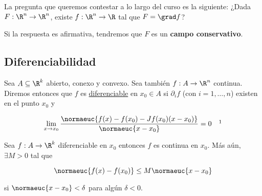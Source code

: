 \begin{pre}
    La pregunta que queremos contestar a lo largo del curso es la siguiente: ¿Dada $F: \R^n \rightarrow \R^n$, existe $f: \R^n \rightarrow \R$ tal que $F = \grad f$?
    
    Si la respuesta es afirmativa, tendremos que $F$ es un \textbf{campo conservativo}.
\end{pre}

\subsection{Diferenciabilidad}

\begin{defn}
    Sea $A \subseteq \R^k$ abierto, conexo y convexo. Sea también $f: A \rightarrow \R^n$ continua. Diremos entonces que $f$ es \ul{diferenciable} en $x_0 \in A$ si $\partial_i f$ (con $i = 1, \dots, n$) existen en el punto $x_0$ y 
    
    \[
    \lim_{x \to x_0} \frac{\normaeuc{f(x) - f(x_0) - Jf(x_0)(x - x_0)}}{\normaeuc{x - x_0}} = 0 \quad \footnotemark
    \]
\end{defn}

\begin{teo}\label{teo:1.3.1}
    Sea $f: A \rightarrow \R^k$ diferenciable en $x_0$ entonces $f$ es continua en $x_0$. Más aún, $\exists M > 0$ tal que
    
    \[
    \normaeuc{f(x) - f(x_0)} \leq M \normaeuc{x - x_0}
    \]
    
    \noindent si $\normaeuc{x - x_0} < \delta$ para algún $\delta < 0$.
\end{teo}

